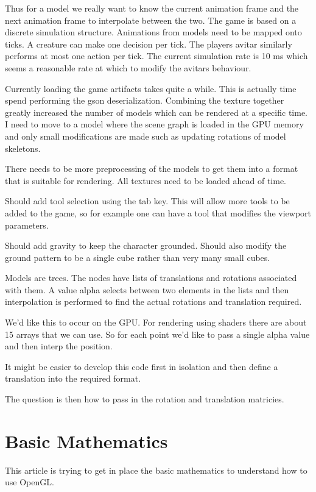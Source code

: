 \documentclass[12pt]{article}
\begin{document}
Thus for a model we really want to know the current animation frame
and the next animation frame to interpolate between the two. The game
is based on a discrete simulation structure. Animations from models
need to be mapped onto ticks. A creature can make one decision per
tick. The players avitar similarly performs at most one action per
tick. The current simulation rate is 10 ms which seems a reasonable
rate at which to modify the avitars behaviour.

Currently loading the game artifacts takes quite a while. This is
actually time spend performing the gson deserialization. Combining the
texture together greatly increased the number of models which can be
rendered at a specific time. I need to move to a model where the scene
graph is loaded in the GPU memory and only small modifications are
made such as updating rotations of model skeletons.

There needs to be more preprocessing of the models to get them into a
format that is suitable for rendering. All textures need to be loaded
ahead of time.

Should add tool selection using the tab key. This will allow more
tools to be added to the game, so for example one can have a tool that
modifies the viewport parameters.

Should add gravity to keep the character grounded. Should also modify
the ground pattern to be a single cube rather than very many small
cubes.

Models are trees. The nodes have lists of translations and rotations
associated with them. A value alpha selects between two elements in
the lists and then interpolation is performed to find the actual
rotations and translation required.

We'd like this to occur on the GPU. For rendering using shaders there
are about 15 arrays that we can use. So for each point we'd like to
pass a single alpha value and then interp the position.

It might be easier to develop this code first in isolation and then
define a translation into the required format.

The question is then how to pass in the rotation and translation
matricies.

\section{Basic Mathematics}


This article is trying to get in place the basic mathematics to
understand how to use OpenGL.
\end{document}
